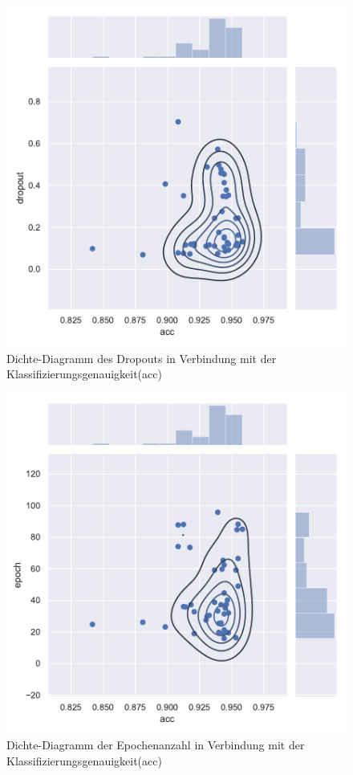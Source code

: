 \begin{figure}[H]
  \centering  
  \includegraphics[scale=0.5]{anhang/GA_250_mnist_digits_True_big_jointplot_dropout.pdf}
  \caption{Dichte-Diagramm des Dropouts in Verbindung mit der Klassifizierungsgenauigkeit(acc)}
  
\end{figure}

\begin{figure}[H]
  \centering  
  \includegraphics[scale=0.5]{anhang/GA_250_mnist_digits_True_big_jointplot_epoch.pdf}
  \caption{Dichte-Diagramm der Epochenanzahl in Verbindung mit der Klassifizierungsgenauigkeit(acc)}
  
\end{figure}

